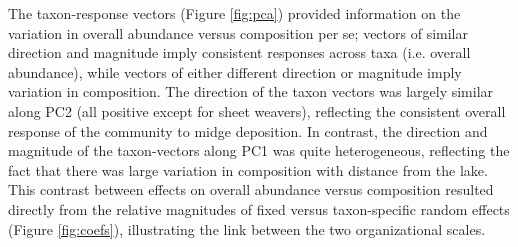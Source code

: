 The taxon-response vectors (Figure \ref{fig:pca})
provided information on the variation in overall abundance versus composition per se;
vectors of similar direction and magnitude
imply consistent responses across taxa (i.e. overall abundance),
while vectors of either different direction or magnitude imply variation in composition.
The direction of the taxon vectors was largely similar along PC2 (all positive
except for sheet weavers), reflecting the consistent overall
response of the community to midge deposition.
In contrast, the direction and magnitude
of the taxon-vectors along PC1 was quite heterogeneous,
reflecting the fact that there was large variation in composition with
distance from the lake.
This contrast between effects on overall abundance versus composition
resulted directly from the relative magnitudes
of fixed versus taxon-specific random effects (Figure \ref{fig:coefs}),
illustrating the link between the two organizational scales.

